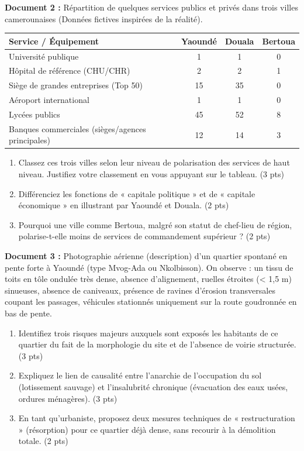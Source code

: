 \documentclass[11pt]{article}
\begin{document}
\begin{exercice}
\textbf{Document 2 :} Répartition de quelques services publics et privés dans trois villes camerounaises (Données fictives inspirées de la réalité).

\begin{tabular}{lccc}
\toprule
\textbf{Service / Équipement} & \textbf{Yaoundé} & \textbf{Douala} & \textbf{Bertoua} \\
\midrule
Université publique & 1 & 1 & 0 \\
Hôpital de référence (CHU/CHR) & 2 & 2 & 1 \\
Siège de grandes entreprises (Top 50) & 15 & 35 & 0 \\
Aéroport international & 1 & 1 & 0 \\
Lycées publics & 45 & 52 & 8 \\
Banques commerciales (sièges/agences principales) & 12 & 14 & 3 \\
\bottomrule
\end{tabular}
\begin{enumerate}
    \item Classez ces trois villes selon leur niveau de polarisation des services de haut niveau. Justifiez votre classement en vous appuyant sur le tableau. (3 pts)
    \item Différenciez les fonctions de « capitale politique » et de « capitale économique » en illustrant par Yaoundé et Douala. (2 pts)
    \item Pourquoi une ville comme Bertoua, malgré son statut de chef-lieu de région, polarise-t-elle moins de services de commandement supérieur ? (2 pts)
\end{enumerate}
\end{exercice}

\begin{exercice}
\textbf{Document 3 :} Photographie aérienne (description) d'un quartier spontané en pente forte à Yaoundé (type Mvog-Ada ou Nkolbisson). On observe : un tissu de toits en tôle ondulée très dense, absence d'alignement, ruelles étroites (< 1,5 m) sinueuses, absence de caniveaux, présence de ravines d'érosion transversales coupant les passages, véhicules stationnés uniquement sur la route goudronnée en bas de pente.
\begin{enumerate}
    \item Identifiez trois risques majeurs auxquels sont exposés les habitants de ce quartier du fait de la morphologie du site et de l'absence de voirie structurée. (3 pts)
    \item Expliquez le lien de causalité entre l'anarchie de l'occupation du sol (lotissement sauvage) et l'insalubrité chronique (évacuation des eaux usées, ordures ménagères). (3 pts)
    \item En tant qu'urbaniste, proposez deux mesures techniques de « restructuration » (résorption) pour ce quartier déjà dense, sans recourir à la démolition totale. (2 pts)
\end{enumerate}
\end{exercice}
\end{document}
